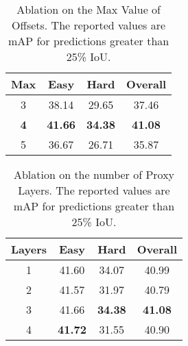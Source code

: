 \begin{table}
    \centering
    \begin{tabular}{c |c c |c}
    \toprule
    Max & Easy &  Hard& Overall\\
    \midrule
     3 & 38.14 & 29.65 & 37.46 \\
     \textbf{4} & \textbf{41.66} & \textbf{34.38} & \textbf{41.08} \\
     5 & 36.67 & 26.71 & 35.87 \\
    \bottomrule
    \end{tabular}
    \caption{Ablation on the Max Value of Offsets. The reported values are mAP for predictions greater than 25\% IoU.}
    \label{tab:max value}
\end{table}



\begin{table}
    \centering
    \begin{tabular}{c |c c |c}
    \toprule
    Layers & Easy &  Hard& Overall\\
    \midrule
     1 & 41.60 & 34.07 & 40.99 \\
     2 & 41.57 & 31.97 & 40.79 \\
     3 & 41.66 & \textbf{34.38} & \textbf{41.08} \\
     4 & \textbf{41.72} & 31.55 & 40.90 \\
    \bottomrule
    \end{tabular}
    \caption{Ablation on the number of Proxy Layers. The reported values are mAP for predictions greater than 25\% IoU.}
    \label{tab:layers}
    \vspace{-0.2cm}
\end{table}